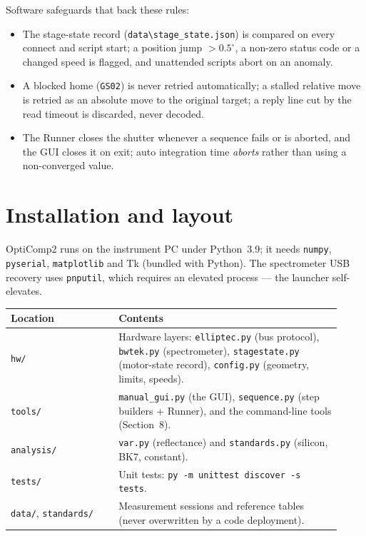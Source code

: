 \documentclass[11pt]{article}
\newcommand{\code}[1]{\texttt{\small #1}}
\begin{document}
\noindent Software safeguards that back these rules:
\begin{itemize}
\item The stage-state record (\code{data\textbackslash stage\_state.json}) is compared on every
connect and script start; a position jump $>0.5^\circ$, a non-zero status code or a changed speed is
flagged, and unattended scripts abort on an anomaly.
\item A blocked home (\code{GS02}) is never retried automatically; a stalled relative move is retried
as an absolute move to the original target; a reply line cut by the read timeout is discarded, never
decoded.
\item The Runner closes the shutter whenever a sequence fails or is aborted, and the GUI closes it on
exit; auto integration time \emph{aborts} rather than using a non-converged value.
\end{itemize}

\section{Installation and layout}

OptiComp2 runs on the instrument PC under Python~3.9; it needs \code{numpy}, \code{pyserial},
\code{matplotlib} and Tk (bundled with Python). The spectrometer USB recovery uses \code{pnputil},
which requires an elevated process --- the launcher self-elevates.

\begin{center}
\begin{tabular}{>{\raggedright\arraybackslash}p{0.30\linewidth} >{\raggedright\arraybackslash}p{0.62\linewidth}}
\toprule
\textbf{Location} & \textbf{Contents} \\
\midrule
\code{hw/} & Hardware layers: \code{elliptec.py} (bus protocol), \code{bwtek.py} (spectrometer),
\code{stagestate.py} (motor-state record), \code{config.py} (geometry, limits, speeds). \\
\code{tools/} & \code{manual\_gui.py} (the GUI), \code{sequence.py} (step builders + Runner),
and the command-line tools (Section~8). \\
\code{analysis/} & \code{var.py} (reflectance) and \code{standards.py} (silicon, BK7, constant). \\
\code{tests/} & Unit tests: \code{py -m unittest discover -s tests}. \\
\code{data/}, \code{standards/} & Measurement sessions and reference tables (never overwritten by a
code deployment). \\
\bottomrule
\end{tabular}
\end{center}
\end{document}
